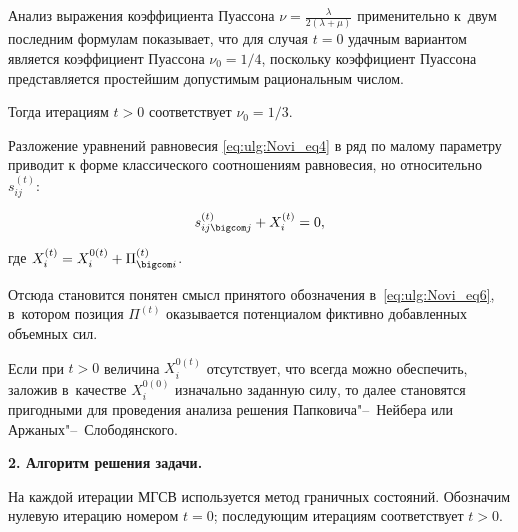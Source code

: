 Анализ выражения коэффициента Пуассона $\nu =\frac{\lambda }{2\left( \lambda +\mu  \right)}$  применительно к~двум последним формулам показывает, что для случая $t=0$ удачным вариантом является коэффициент Пуассона ${{\nu }_{0}}=1/4$, поскольку коэффициент Пуассона представляется простейшим допустимым рациональным числом. 

Тогда итерациям $t>0$ соответствует ${{\nu }_{0}}=1/3$.



Разложение уравнений равновесия \eqref{eq:ulg:Novi_eq4} в ряд по малому параметру приводит к форме классического соотношениям равновесия, но относительно $s_{i j}^{(t)} $:

\[

s_{i j \bigcom j}^{(t)} +X_{i}^{(t)} =0,

\] 

где $X_{i}^{(t)} =X_{i}^{0(t)} +\Pi _{\bigcom i}^{(t)} $. 

Отсюда становится понятен смысл принятого обозначения в~\eqref{eq:ulg:Novi_eq6}, в~котором позиция $\Pi ^{(t)} $ оказывается потенциалом фиктивно добавленных объемных сил. 

Если при $t>0$ величина $X_{i}^{0(t)} $ отсутствует, что всегда можно обеспечить, заложив в~качестве $X_{i}^{0(0)} $ изначально заданную силу, то далее становятся пригодными для проведения анализа решения Папковича"--~Нейбера или Аржаных"--~Слободянского.  



\smallskip



{\bf 2. Алгоритм решения задачи.}

На каждой итерации МГСВ используется метод граничных состояний. Обозначим нулевую итерацию номером $t=0$; последующим итерациям соответствует $t>0$.



